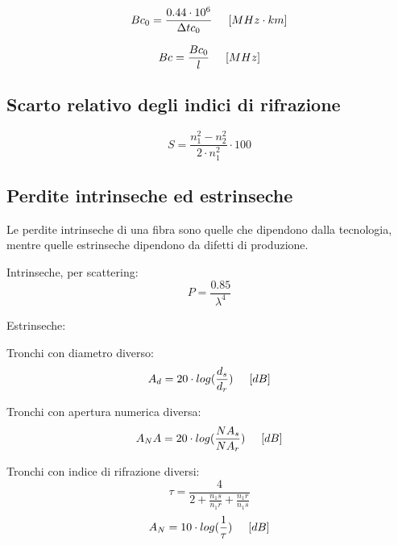 \documentclass{article}
\begin{document}
    \begin{equation}
        Bc_0 = \frac{0.44 \cdot 10^6}{\Delta tc_0} \hspace{0.5cm} [MHz \cdot km]
    \end{equation}

    \begin{equation}
        Bc = \frac{Bc_0}{l} \hspace{0.5cm} [MHz]
    \end{equation}

    \subsection{Scarto relativo degli indici di rifrazione}

    \begin{equation}
        S = \frac{n_1^2 - n_2^2}{2 \cdot n_1^2} \cdot 100
    \end{equation}

    \subsection{Perdite intrinseche ed estrinseche}

    Le perdite intrinseche di una fibra sono quelle che dipendono dalla tecnologia, mentre quelle estrinseche dipendono da
    difetti di produzione.

    Intrinseche, per scattering:
    \begin{equation}
        P = \frac{0.85}{\lambda ^ 4}
    \end{equation}

    Estrinseche:

    Tronchi con diametro diverso:
    \begin{equation}
        A_d = 20 \cdot log(\frac{d_s}{d_r}) \hspace{0.5cm} [dB]
    \end{equation}

    Tronchi con apertura numerica diversa:
    \begin{equation}
        A_NA = 20 \cdot log(\frac{NA_s}{NA_r}) \hspace{0.5cm} [dB]
    \end{equation}

    Tronchi con indice di rifrazione diversi:
    \begin{equation}
        \tau = \frac{4}{
            2 + \frac{n_1s}{n_1r} + \frac{n_1r}{n_1s}
        }
    \end{equation}
    \begin{equation}
        A_N = 10 \cdot log(\frac{1}{\tau}) \hspace{0.5cm} [dB]
    \end{equation}
\end{document}
